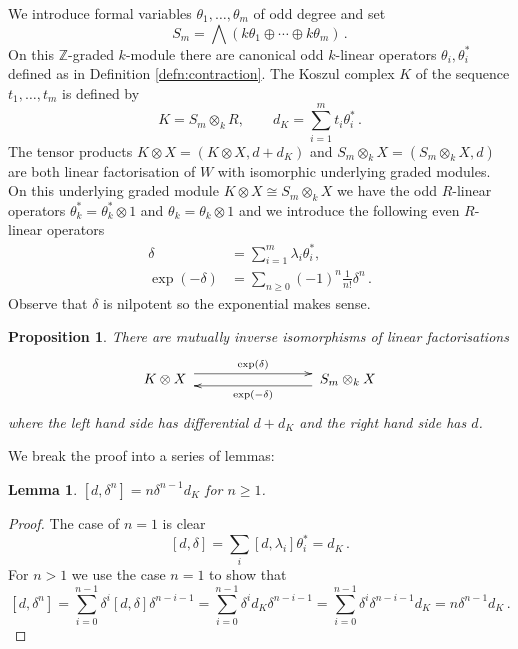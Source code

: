 \documentclass[english,letter paper,12pt,leqno]{article}
\newtheorem{proposition}[theorem]{Proposition}
\newtheorem{lemma}[theorem]{Lemma}
\theoremstyle{example}
\numberwithin{equation}{section}
\def\be{\begin{equation}}
\def\ee{\end{equation}}
\def\nZ{\mathds{Z}}
\begin{document}
We introduce formal variables $\theta_1,\ldots,\theta_m$ of odd degree and set
\[
S_m = \bigwedge\left( k \theta_1 \oplus \cdots \oplus k \theta_m \right)\,.
\]
On this $\nZ$-graded $k$-module there are canonical odd $k$-linear operators $\theta_i, \theta_i^*$ defined as in Definition \ref{defn:contraction}. The Koszul complex $K$ of the sequence $t_1,\ldots,t_m$ is defined by
\begin{equation}\label{defn:koszul}
K = S_m \otimes_k R, \qquad d_K = \sum_{i=1}^m t_i \theta_i^*\,.
\end{equation} 
The tensor products $K \otimes X = (K \otimes X, d + d_K)$ and $S_m \otimes_k X = ( S_m \otimes_k X, d )$ are both linear factorisation of $W$ with isomorphic underlying graded modules. On this underlying graded module $K \otimes X \cong S_m \otimes_k X$ we have the odd $R$-linear operators $\theta_k^* = \theta_k^* \otimes 1$ and $\theta_k = \theta_k \otimes 1$ and we introduce the following even $R$-linear operators
\begin{align*}
\delta &= \sum_{i=1}^m \lambda_i \theta_i^*,\\
\exp(-\delta) &= \sum_{n \ge 0} (-1)^n \frac{1}{n!} \delta^n\,.
\end{align*}
Observe that $\delta$ is nilpotent so the exponential makes sense.

\begin{proposition}\label{prop:equivalencekoszul} There are mutually inverse isomorphisms of linear factorisations
\be\label{eq:equivalencekoszul}
\xymatrix@C+5pc{ K \otimes X\; \ar@<1ex>[r]^-{ \exp(\delta) } & \;S_m \otimes_k X \ar@<1ex>[l]^-{ \exp(-\delta) } }
\ee
where the left hand side has differential $d + d_K$ and the right hand side has $d$.
\end{proposition}

We break the proof into a series of lemmas:

\begin{lemma}\label{lemma:pert1} $[d, \delta^n] = n \delta^{n-1} d_K$ for $n \ge 1$.
\end{lemma}
\begin{proof}
The case of $n = 1$ is clear
\[
[d, \delta] = \sum_i [d, \lambda_i] \theta_i^* = d_K\,.
\]
For $n > 1$ we use the case $n = 1$ to show that
\[
[ d, \delta^n ] = \sum_{i=0}^{n-1} \delta^i [d, \delta] \delta^{n-i-1} = \sum_{i=0}^{n-1} \delta^i d_K \delta^{n-i-1} = \sum_{i=0}^{n-1} \delta^i \delta^{n-i-1} d_K = n \delta^{n-1} d_K\,.
\]
\end{proof}
\end{document}
